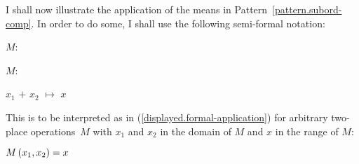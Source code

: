 \documentclass[output=paper
  ,nobabel
  ,draftmode
  ,colorlinks, citecolor=brown
]{langscibook}
\begin{document}
I shall now illustrate the application of the means in Pattern \ref{pattern.subord-comp}. In order to do some, I shall use
the following semi-formal notation: \begin{exe}
\ex \raggedright
\begin{labeledlist}{$M$:}
\item[$M$:] \raggedright $x_{1}$ $+$ $x_{2}$ $↦$ $x$
\end{labeledlist}
\end{exe} 
This is to be interpreted as in (\ref{displayed.formal-application}) for arbitrary two-place
operations $M$ with $x_{1}$ and $x_{2}$ in the domain of $M$ and $x$ in the range of $M$: \begin{exe}
\ex \label{displayed.formal-application}\raggedright $\displaystyle M\left(\smash{x_{1},x_{2}}\right)=x$
\end{exe}
\end{document}

